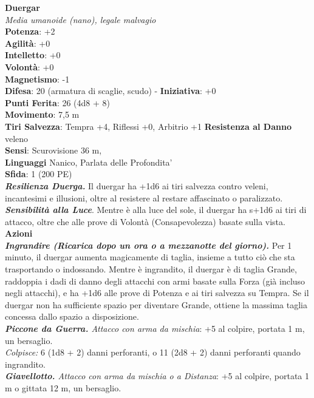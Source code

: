 \begin{multicols}{2}
\medskip\textbf{Duergar}\\
\emph{Media umanoide (nano), legale malvagio}\\
\textbf{Potenza}: +2\\
\textbf{Agilità}: +0\\
\textbf{Intelletto}: +0\\
\textbf{Volontà}: +0\\
\textbf{Magnetismo}: -1\\
\textbf{Difesa}: 20 (armatura di scaglie, scudo) - \textbf{Iniziativa}: +0\\
\textbf{Punti Ferita}: 26 (4d8 + 8)\\
\textbf{Movimento}: 7,5 m\\
\textbf{Tiri Salvezza}: Tempra +4, Riflessi +0, Arbitrio +1
\textbf{Resistenza al Danno} veleno\\
\textbf{Sensi}: Scurovisione 36 m, \\
\textbf{Linguaggi} Nanico, Parlata delle Profondita'\\
\textbf{Sfida}: 1 (200 PE)\smallskip\\
\emph{\textbf{Resilienza Duerga.}} Il duergar ha +1d6 ai tiri salvezza contro veleni, incantesimi e illusioni, oltre al resistere al restare affascinato o paralizzato.\\
\emph{\textbf{Sensibilità alla Luce}}. Mentre è alla luce del sole, il duergar ha s+1d6 ai tiri di attacco, oltre che alle prove di Volontà (Consapevolezza) basate sulla vista.\\
\smallskip\textbf{Azioni}\\
\emph{\textbf{Ingrandire (Ricarica dopo un ora o a mezzanotte del giorno).}} Per 1 minuto, il duergar aumenta magicamente di taglia, insieme a tutto ciò che sta trasportando o indossando. Mentre è ingrandito, il duergar è di taglia Grande, raddoppia i dadi di danno degli attacchi con armi basate sulla Forza (già incluso negli attacchi), e ha +1d6 alle prove di Potenza e ai tiri salvezza su Tempra. Se il duergar non ha sufficiente spazio per diventare Grande, ottiene la massima taglia concessa dallo spazio a disposizione.\\
\emph{\textbf{Piccone da Guerra.} Attacco con arma da mischia}: +5 al colpire, portata 1 m, un bersaglio.\\
\emph{Colpisce:} 6 (1d8 + 2) danni perforanti, o 11 (2d8 + 2) danni perforanti quando ingrandito.\\
\emph{\textbf{Giavellotto.} Attacco con arma da mischia o a Distanza}: +5 al colpire, portata 1 m o gittata 12 m, un bersaglio.\\

\end{multicols}
